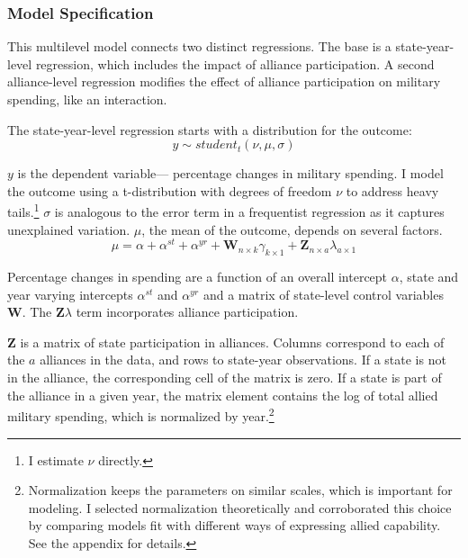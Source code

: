 \documentclass[12pt]{article}
\begin{document}
\subsubsection{Model Specification} 

This multilevel model connects two distinct regressions. 
The base is a state-year-level regression, which includes the impact of alliance participation.
A second alliance-level regression modifies the effect of alliance participation on military spending, like an interaction. 


The state-year-level regression starts with a distribution for the outcome:
\begin{equation}
y \sim student_t(\nu, \mu, \sigma)
\end{equation}
 

$y$ is the dependent variable--- percentage changes in military spending. 
I model the outcome using a t-distribution with degrees of freedom $\nu$ to address heavy tails.\footnote{I estimate $\nu$ directly.}
$\sigma$ is analogous to the error term in a frequentist regression as it captures unexplained variation.  
$\mu$, the mean of the outcome, depends on several factors.
\begin{equation}
\mu = \alpha + \alpha^{st} + \alpha^{yr} +\textbf{W}_{n \times k} \gamma_{k \times 1}  + \textbf{Z}_{n \times a} \lambda_{a \times 1} 
\end{equation}


Percentage changes in spending are a function of an overall intercept $\alpha$, state and year varying intercepts $\alpha^{st}$ and $\alpha^{yr}$ and a matrix of state-level control variables $\textbf{W}$.
The $\textbf{Z} \lambda$ term incorporates alliance participation.


$\textbf{Z}$ is a matrix of state participation in alliances. 
Columns correspond to each of the $a$ alliances in the data, and rows to state-year observations. 
If a state is not in the alliance, the corresponding cell of the matrix is zero.
If a state is part of the alliance in a given year, the matrix element contains the log of total allied military spending, which is normalized by year.\footnote{Normalization keeps the parameters on similar scales, which is important for modeling. I selected normalization theoretically and corroborated this choice by comparing models fit with different ways of expressing allied capability. See the appendix for details.} 
\end{document}
